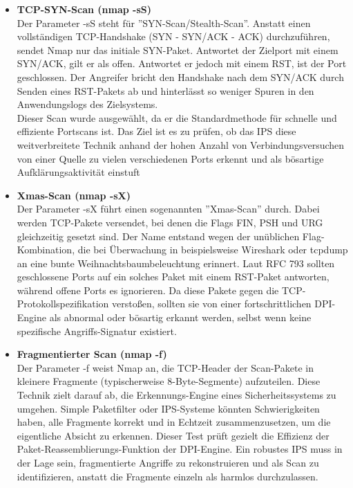 \begin{itemize}
	\item \textbf{TCP-SYN-Scan (nmap -sS)}\\
	Der Parameter -sS steht für ''SYN-Scan/Stealth-Scan''. Anstatt einen vollständigen TCP-Handshake (SYN - SYN/ACK - ACK) durchzuführen, sendet Nmap nur das initiale SYN-Paket. Antwortet der Zielport mit einem SYN/ACK, gilt er als offen. Antwortet er jedoch mit einem RST, ist der Port geschlossen. Der Angreifer bricht den Handshake nach dem SYN/ACK durch Senden eines RST-Pakets ab und hinterlässt so weniger Spuren in den Anwendungslogs des Zielsystems.\\
	Dieser Scan wurde ausgewählt, da er die Standardmethode für schnelle und effiziente Portscans ist. Das Ziel ist es zu prüfen, ob das IPS diese weitverbreitete Technik anhand der hohen Anzahl von Verbindungsversuchen von einer Quelle zu vielen verschiedenen Ports erkennt und als bösartige Aufklärungsaktivität einstuft\\
	
	\item \textbf{Xmas-Scan (nmap -sX)}\\
	 Der Parameter -sX führt einen sogenannten ''Xmas-Scan'' durch. Dabei werden TCP-Pakete versendet, bei denen die Flags FIN, PSH und URG gleichzeitig gesetzt sind. Der Name entstand wegen der unüblichen Flag-Kombination, die bei Überwachung in beispielsweise Wireshark oder tcpdump an eine bunte Weihnachtsbaumbeleuchtung erinnert. Laut RFC 793 sollten geschlossene Ports auf ein solches Paket mit einem RST-Paket antworten, während offene Ports es ignorieren.\cite{TCP}
	 Da diese Pakete gegen die TCP-Protokollspezifikation verstoßen, sollten sie von einer fortschrittlichen DPI-Engine als abnormal oder bösartig erkannt werden, selbst wenn keine spezifische Angriffs-Signatur existiert.\\

	\item \textbf{Fragmentierter Scan (nmap -f)}\\
	Der Parameter -f weist Nmap an, die TCP-Header der Scan-Pakete in kleinere Fragmente (typischerweise 8-Byte-Segmente) aufzuteilen. Diese Technik zielt darauf ab, die Erkennungs-Engine eines Sicherheitssystems zu umgehen. Simple Paketfilter oder IPS-Systeme könnten Schwierigkeiten haben, alle Fragmente korrekt und in Echtzeit zusammenzusetzen, um die eigentliche Absicht zu erkennen.
	Dieser Test prüft gezielt die Effizienz der Paket-Reassemblierungs-Funktion der DPI-Engine. Ein robustes IPS muss in der Lage sein, fragmentierte Angriffe zu rekonstruieren und als Scan zu identifizieren, anstatt die Fragmente einzeln als harmlos durchzulassen.\\
	

\end{itemize}
